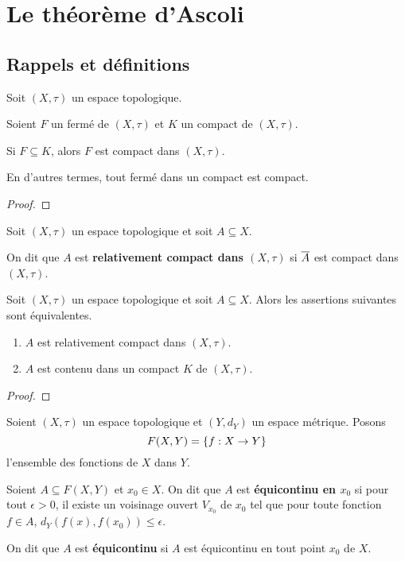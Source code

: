 \chapter{Le théorème d'Ascoli}

\section{Rappels et définitions}

\begin{proposition}
	Soit $(X, \tau)$ un espace topologique.

	Soient $F$ un fermé de $(X, \tau)$ et $K$ un compact de $(X, \tau)$.

	Si $F \subseteq K$, alors $F$ est compact dans $(X, \tau)$.

	En d'autres termes, tout fermé dans un compact est compact.
\end{proposition}

\ifdefined\outputproof
\begin{proof}

\end{proof}
\fi

\begin{definition}
	Soit $(X, \tau)$ un espace topologique et soit $A \subseteq X$.

	On dit que $A$ est \textbf{relativement compact dans $(X, \tau)$} si
	$\overline{A}$ est compact dans $(X, \tau)$.
\end{definition}

\begin{proposition}
	Soit $(X, \tau)$ un espace topologique et soit $A \subseteq X$.
	Alors les assertions suivantes sont équivalentes.
	\begin{enumerate}
		\item $A$ est relativement compact dans $(X, \tau)$.
		\item $A$ est contenu dans un compact $K$ de $(X, \tau)$.
	\end{enumerate}
\end{proposition}

\ifdefined\outputproof
\begin{proof}

\end{proof}
\fi

\begin{definition}
	Soient $(X, \tau)$ un espace topologique et $(Y, d_{Y})$ un espace métrique.
	Posons
	\begin{equation}
		F(X, Y) = \left\{ f : X \rightarrow Y \right\}
	\end{equation}
	l'ensemble des fonctions de $X$ dans $Y$.

	Soient $A \subseteq F(X, Y)$ et $x_{0} \in X$.
	On dit que $A$ est \textbf{équicontinu en $x_{0}$} si pour tout $\epsilon >
	0$, il existe un voisinage ouvert $V_{x_{0}}$ de $x_{0}$ tel que pour toute
	fonction $f \in A$, $d_{Y}(f(x), f(x_{0})) \leq \epsilon$.

	On dit que $A$ est \textbf{équicontinu} si $A$ est équicontinu en tout point
	$x_{0}$ de $X$.
\end{definition}

